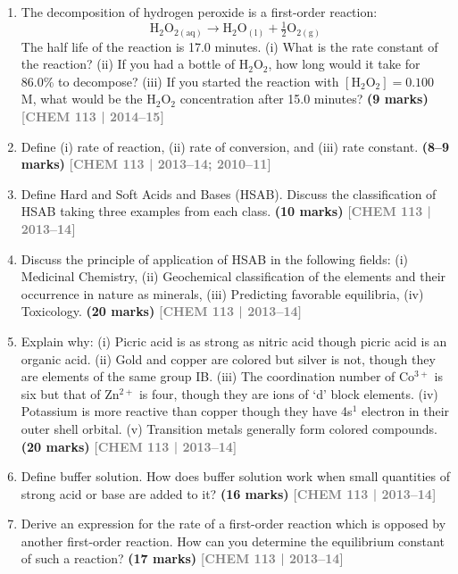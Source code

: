 \documentclass[12pt,a3paper]{article}
\newcommand{\yr}[1]{\hfill\textcolor{gray}{\small\textbf{[#1]}}}
\newcommand{\mk}[1]{\textcolor{orange!70!black}{\small\textbf{(#1 marks)}}}
\begin{document}
\begin{enumerate}
\item The decomposition of hydrogen peroxide is a first-order reaction:
\[ \text{H}_2\text{O}_{2(\text{aq})} \rightarrow \text{H}_2\text{O}_{(\text{l})} + \tfrac{1}{2}\text{O}_{2(\text{g})} \]
The half life of the reaction is 17.0 minutes. (i) What is the rate constant of the reaction? (ii) If you had a bottle of H$_2$O$_2$, how long would it take for 86.0\% to decompose? (iii) If you started the reaction with $[\text{H}_2\text{O}_2] = 0.100$ M, what would be the H$_2$O$_2$ concentration after 15.0 minutes? \mk{9}
\yr{CHEM 113 | 2014--15}

\item Define (i) rate of reaction, (ii) rate of conversion, and (iii) rate constant. \mk{8--9}
\yr{CHEM 113 | 2013--14; 2010--11}

\item Define Hard and Soft Acids and Bases (HSAB). Discuss the classification of HSAB taking three examples from each class. \mk{10}
\yr{CHEM 113 | 2013--14}



\item Discuss the principle of application of HSAB in the following fields: (i) Medicinal Chemistry, (ii) Geochemical classification of the elements and their occurrence in nature as minerals, (iii) Predicting favorable equilibria, (iv) Toxicology. \mk{20}
\yr{CHEM 113 | 2013--14}



\item Explain why: (i) Picric acid is as strong as nitric acid though picric acid is an organic acid. (ii) Gold and copper are colored but silver is not, though they are elements of the same group IB. (iii) The coordination number of Co$^{3+}$ is six but that of Zn$^{2+}$ is four, though they are ions of `d' block elements. (iv) Potassium is more reactive than copper though they have 4s$^1$ electron in their outer shell orbital. (v) Transition metals generally form colored compounds. \mk{20}
\yr{CHEM 113 | 2013--14}



\item Define buffer solution. How does buffer solution work when small quantities of strong acid or base are added to it? \mk{16}
\yr{CHEM 113 | 2013--14}

\item Derive an expression for the rate of a first-order reaction which is opposed by another first-order reaction. How can you determine the equilibrium constant of such a reaction? \mk{17}
\yr{CHEM 113 | 2013--14}


\end{enumerate}
\end{document}
